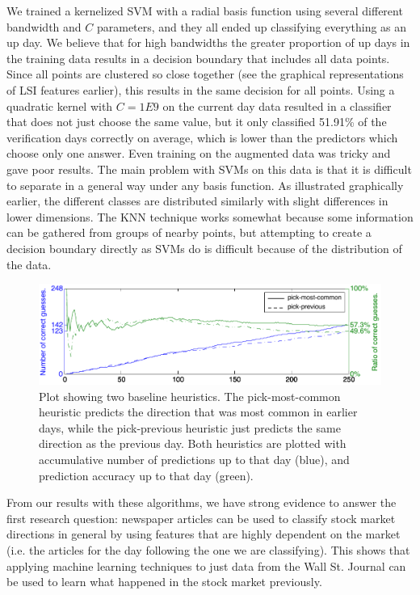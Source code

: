 \documentclass[10pt, twocolumn]{article}
\begin{document}
We trained a kernelized SVM with a radial basis function using several different bandwidth and $C$ parameters, and they all ended up classifying everything as an up day. We believe that for high bandwidths the greater proportion of up days in the training data results in a decision boundary that includes all data points. Since all points are clustered so close together (see the graphical representations of LSI features earlier), this results in the same decision for all points. Using a quadratic kernel with $C=1E9$ on the current day data resulted in a classifier that does not just choose the same value, but it only classified 51.91\% of the verification days correctly on average, which is lower than the predictors which choose only one answer. Even training on the augmented data was tricky and gave poor results. The main problem with SVMs on this data is that it is difficult to separate in a general way under any basis function. As illustrated graphically earlier, the different classes are distributed similarly with slight differences in lower dimensions. The KNN technique works somewhat because some information can be gathered from groups of nearby points, but attempting to create a decision boundary directly as SVMs do is difficult because of the distribution of the data.

\begin{figure}[t]
\center
\hspace{0.5cm}
\includegraphics[width=16cm]{experiments/seq_baseline.pdf}
\caption{Plot showing two baseline heuristics. The pick-most-common heuristic predicts the direction that was most common in earlier days, while the pick-previous heuristic just predicts the same direction as the previous day. Both heuristics are plotted with accumulative number of predictions up to that day (blue), and prediction accuracy up to that day (green).}
\label{fig:seq-baseline}
\end{figure}

From our results with these algorithms, we have strong evidence to answer the first research question: newspaper articles can be used to classify stock market directions in general by using features that are highly dependent on the market (i.e. the articles for the day following the one we are classifying). This shows that applying machine learning techniques to just data from the Wall St. Journal can be used to learn what happened in the stock market previously.
\end{document}
